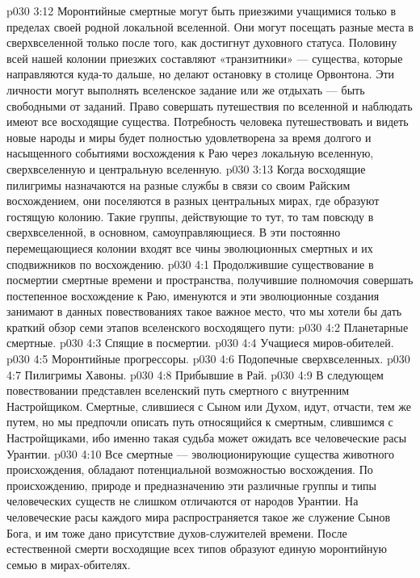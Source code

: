 \vs p030 3:12 Моронтийные смертные могут быть приезжими учащимися только в пределах своей родной локальной вселенной. Они могут посещать разные места в сверхвселенной только после того, как достигнут духовного статуса. Половину всей нашей колонии приезжих составляют «транзитники» --- существа, которые направляются куда\hyp{}то дальше, но делают остановку в столице Орвонтона. Эти личности могут выполнять вселенское задание или же отдыхать --- быть свободными от заданий. Право совершать путешествия по вселенной и наблюдать имеют все восходящие существа. Потребность человека путешествовать и видеть новые народы и миры будет полностью удовлетворена за время долгого и насыщенного событиями восхождения к Раю через локальную вселенную, сверхвселенную и центральную вселенную.
\vs p030 3:13 \bibnobreakspace {} Когда восходящие пилигримы назначаются на разные службы в связи со своим Райским восхождением, они поселяются в разных центральных мирах, где образуют гостящую колонию. Такие группы, действующие то тут, то там повсюду в сверхвселенной, в основном, самоуправляющиеся. В эти постоянно перемещающиеся колонии входят все чины эволюционных смертных и их сподвижников по восхождению.
\vs p030 4:1 Продолжившие существование в посмертии смертные времени и пространства, получившие полномочия совершать постепенное восхождение к Раю, именуются  и эти эволюционные создания занимают в данных повествованиях такое важное место, что мы хотели бы дать краткий обзор семи этапов вселенского восходящего пути:
\vs p030 4:2 \bibnobreakspace Планетарные смертные.
\vs p030 4:3 \bibnobreakspace Спящие в посмертии.
\vs p030 4:4 \bibnobreakspace Учащиеся миров\hyp{}обителей.
\vs p030 4:5 \bibnobreakspace Моронтийные прогрессоры.
\vs p030 4:6 \bibnobreakspace Подопечные сверхвселенных.
\vs p030 4:7 \bibnobreakspace Пилигримы Хавоны.
\vs p030 4:8 \bibnobreakspace Прибывшие в Рай.
\vs p030 4:9 \pc В следующем повествовании представлен вселенский путь смертного с внутренним Настройщиком. Смертные, слившиеся с Сыном или Духом, идут, отчасти, тем же путем, но мы предпочли описать путь относящийся к смертным, слившимся с Настройщиками, ибо именно такая судьба может ожидать все человеческие расы Урантии.
\vs p030 4:10 \bibnobreakspace {} Все смертные --- эволюционирующие существа животного происхождения, обладают потенциальной возможностью восхождения. По происхождению, природе и предназначению эти различные группы и типы человеческих существ не слишком отличаются от народов Урантии. На человеческие расы каждого мира распространяется такое же служение Сынов Бога, и им тоже дано присутствие духов\hyp{}служителей времени. После естественной смерти восходящие всех типов образуют единую моронтийную семью в мирах\hyp{}обителях.
